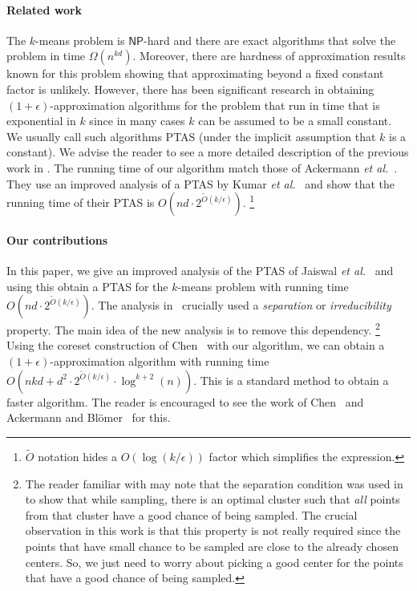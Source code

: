 \documentclass[11pt]{article}
\newcommand{\eps}{{\epsilon}}
\newcommand{\etal}{{\it et al.}}
\begin{document}
\paragraph{Related work}
The $k$-means problem is $\mathsf{NP}$-hard and there are exact algorithms that solve the problem in time $\Omega(n^{kd})$.
Moreover, there are hardness of approximation results known for this problem showing that approximating beyond a fixed constant factor is unlikely. 
However, there has been significant research in obtaining $(1 + \eps)$-approximation algorithms for the problem that run in time that is exponential in $k$ since in many cases $k$ can be assumed to be a small constant.
We usually call such algorithms PTAS (under the implicit assumption that $k$ is a constant).
We advise the reader to see a more detailed description of the previous work in \cite{jks12}.
The running time of our algorithm match those of Ackermann \etal~\cite{abs10}.
They use an improved analysis of a PTAS by Kumar \etal~\cite{KumarSS10} and show that the running time of their PTAS is $O(n d \cdot 2^{\tilde{O}(k/\epsilon)})$.
\footnote{$\tilde{O}$ notation hides a $O(\log{(k/\eps)})$ factor which simplifies the expression.}


\paragraph{Our contributions} 
In this paper, we give an improved analysis of the PTAS of Jaiswal \etal~\cite{jks12} and using this obtain a PTAS for the $k$-means problem with running time $O(n d \cdot 2^{\tilde{O}(k/\epsilon)})$. 
The analysis in~\cite{jks12} crucially used a {\em separation} or {\em irreducibility} property. 
The main idea of the new analysis is to remove this dependency.
\footnote{The reader familiar with \cite{jks12} may note that the separation condition was used in \cite{jks12} to show that while sampling, there is an optimal cluster such that {\em all} points from that cluster have a good chance of being sampled.
The crucial observation in this work is that this property is not really required since the points that have small chance to be sampled are close to the already chosen centers. 
So, we just need to worry about picking a good center for the points that have a good chance of being sampled.}
Using the coreset construction of Chen~\cite{Chen09} with our algorithm, we can obtain a $(1+\eps)$-approximation algorithm with running time $O\left(nkd + d^2 \cdot 2^{\tilde{O}(k/\eps)} \cdot \log^{k+2}{(n)} \right)$.
This is a standard method to obtain a faster algorithm.
The reader is encouraged to see the work of Chen~\cite{Chen09} and Ackermann and Bl\"{o}mer~\cite{ab10} for this.
\end{document}
